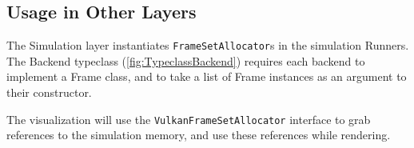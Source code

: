 \subsection{Usage in Other Layers}
The Simulation layer instantiates \texttt{FrameSetAllocator}s in the simulation Runners.
The Backend typeclass (\cref{fig:TypeclassBackend}) requires each backend to implement a Frame class, and to take a list of Frame instances as an argument to their constructor.

The visualization will use the \texttt{VulkanFrameSetAllocator} interface to grab references to the simulation memory, and use these references while rendering.
